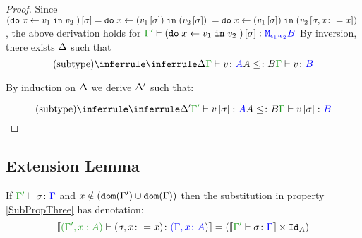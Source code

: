 \documentclass{report}
\begin{document}
\begin{framed}
\begin{proof}
            Since $(\texttt{do}\; x \leftarrow v_1 \;\texttt{in}\; v_2\;)\left[\sigma\right] = \texttt{do}\; x \leftarrow (v_1\left[\sigma\right]) \;\texttt{in}\; (v_2\left[\sigma\right])\; = \texttt{do}\; x \leftarrow (v_1\left[\sigma\right]) \;\texttt{in}\; (v_2\left[\sigma, x\colon= x\right])\;$, the above derivation holds for $\typerelation{\G'}{(\doin{x}{v_1}{v_2})\ssi}{\M{\e_1\dot\e_2}{B}}$
            By inversion, there exists $\Delta$ such that
            \begin{equation}
                \ntreeruleII{subtype}{\treeruleI{\D}{\typerelation{\G}{v}{A}}}{ A\subtype B}{\typerelation{\G}{v}{B}}
            \end{equation}
        
            By induction on $\Delta$ we derive $\Delta'$ such that:
        
            \begin{equation}
                \ntreeruleII{subtype}{\treeruleI{\D'}{\typerelation{\G'}{v\ssi}{A}}}{ A\subtype B}{\typerelation{\G}{v\ssi}{B}}
            \end{equation}
        
    \end{proof}
    
\end{framed}

\subsection{Extension Lemma}

\begin{lemma}
    If $\typerelation{\G'}{\si}{\G}$ and $x\notin(\texttt{dom}(\Gamma')\cup\texttt{dom}(\Gamma))$ then the substitution in property \ref{SubPropThree} has denotation:
    \begin{equation}
        \deno{\typerelation{(\G', x:A)}{(\si, x\setto x)}{(\gax})} = (\deno{\typerelation{\G'}{\si}{\G}}\times \Id{A})
    \end{equation}
\end{lemma}
\end{document}
